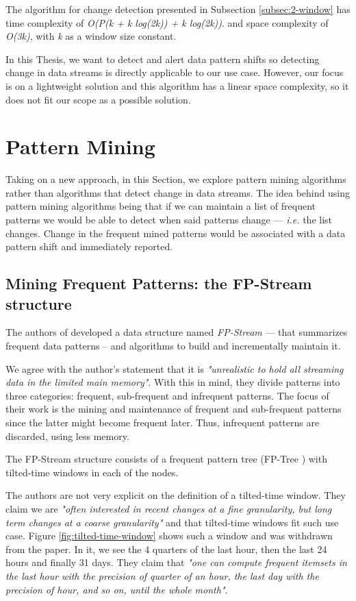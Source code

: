 The algorithm for change detection presented in Subsection \ref{subsec:2-window} has time complexity of \textit{O(P(k + k log(2k)) + k log(2k))}. and space complexity of \textit{O(3k)}, with \textit{k} as a window size constant. 

In this Thesis, we want to detect and alert data pattern shifts so detecting change in data streams is directly applicable to our use case. However, our focus is on a lightweight solution and this algorithm has a linear space complexity, so it does not fit our scope as a possible solution.

\section{Pattern Mining}

Taking on a new approach, in this Section, we explore pattern mining algorithms rather than algorithms that detect change in data streams. The idea behind using pattern mining algorithms being that if we can maintain a list of frequent patterns we would be able to detect when said patterns change --- \textit{i.e.} the list changes. Change in the frequent mined patterns would be associated with a data pattern shift and immediately reported. 

\subsection{Mining Frequent Patterns: the FP-Stream structure}

The authors of \cite{Giannella-Mining-Frequent-Patterns} developed a data structure named \textit{FP-Stream} --- that summarizes frequent data patterns -- and algorithms to build and incrementally maintain it.

We agree with the author's statement that it is \textit{"unrealistic to hold all streaming data in the limited main memory"}. With this in mind, they divide patterns into three categories: frequent, sub-frequent and infrequent patterns. The focus of their work is the mining and maintenance of frequent and sub-frequent patterns since the latter might become frequent later. Thus, infrequent patterns are discarded, using less memory.

The FP-Stream structure consists of a frequent pattern tree (FP-Tree \cite{Han-FP-tree}) with tilted-time windows in each of the nodes.

The authors are not very explicit on the definition of a tilted-time window. They claim we are \textit{"often interested in recent changes at a fine granularity, but long term changes at a coarse granularity"} and that tilted-time windows fit such use case. Figure \ref{fig:tilted-time-window} shows such a window and was withdrawn from the paper. In it, we see the 4 quarters of the last hour, then the last 24 hours and finally 31 days. They claim that \textit{"one can compute frequent itemsets in the last hour with the precision of quarter of an hour, the last day with the precision of hour, and so on, until the whole month"}.


